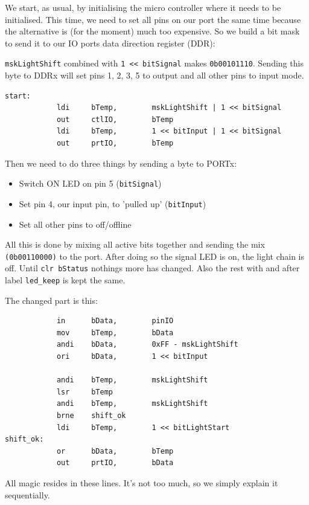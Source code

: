 We start, as usual, by initialising the micro controller where it needs to be initialised. This time, we need to set all pins on our port the same time because the alternative is (for the moment) much too expensive. So we build a bit mask to send it to our IO ports data direction register (DDR):

\texttt{mskLightShift} combined with \texttt{1 << bitSignal} makes \texttt{0b00101110}. Sending this byte to DDRx will set pins 1, 2, 3, 5 to output and all other pins to input mode.

\begin{lstlisting}
start:
            ldi     bTemp,        mskLightShift | 1 << bitSignal
            out     ctlIO,        bTemp
            ldi     bTemp,        1 << bitInput | 1 << bitSignal
            out     prtIO,        bTemp
\end{lstlisting}

Then we need to do three things by sending a byte to PORTx:

\begin{itemize}
  \item Switch ON LED on pin 5 (\texttt{bitSignal})
  \item Set pin 4, our input pin, to 'pulled up' (\texttt{bitInput})
  \item Set all other pins to off/offline
\end{itemize}

All this is done by mixing all active bits together and sending the mix \texttt{(0b00110000)} to the port. After doing so the signal LED is on, the light chain is off. Until \texttt{clr bStatus} nothings more has changed. Also the rest with and after label \texttt{led\_keep} is kept the same.

The changed part is this:

\begin{lstlisting}
            in      bData,        pinIO
            mov     bTemp,        bData
            andi    bData,        0xFF - mskLightShift
            ori     bData,        1 << bitInput

            andi    bTemp,        mskLightShift
            lsr     bTemp
            andi    bTemp,        mskLightShift
            brne    shift_ok
            ldi     bTemp,        1 << bitLightStart
shift_ok:
            or      bData,        bTemp
            out     prtIO,        bData
\end{lstlisting}

All magic resides in these lines. It's not too much, so we simply explain it sequentially.

